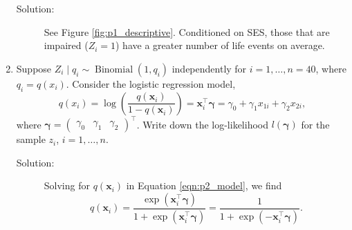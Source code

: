 \documentclass[letterpaper,11pt]{article}
\begin{document}
\begin{enumerate}
  \begin{description}
  \item[Solution:] See Figure \ref{fig:p1_descriptive}. Conditioned on SES,
    those that are impaired ($Z_i = 1$) have a greater number of life events on
    average.
  \end{description}
\item Suppose $Z_i \mid q_i \sim \operatorname{Binomial}\left(1, q_i\right)$
  independently for $i = 1,\ldots, n = 40$, where $q_i =
  q\left(x_i\right)$. Consider the logistic regression model,
  \begin{equation}
    q\left(x_i\right) = \log\left(
      \frac{q\left(\mathbf{x}_i\right)}{1 - q\left(\mathbf{x}_i\right)}
    \right)
    =
    \mathbf{x}_i^\intercal \bm{\gamma}
    = \gamma_0 + \gamma_1 x_{1i} + \gamma_2 x_{2i},
    \label{eqn:p2_model}
  \end{equation}  
  where $\bm{\gamma} = \begin{pmatrix}\gamma_0 & \gamma_1 & \gamma_2
  \end{pmatrix}^\intercal$. Write down the log-likelihood
  $l\left(\bm{\gamma}\right)$ for the sample $z_i$, $i = 1,\ldots, n$.

  \begin{description}
  \item[Solution:] Solving for $q\left(\mathbf{x}_i\right)$ in Equation
    \ref{eqn:p2_model}, we find
    \begin{equation}
      q\left(\mathbf{x}_i\right)
      = \frac{\exp\left(\mathbf{x}_i^\intercal \bm{\gamma}\right)}
      {1 + \exp\left(\mathbf{x}_i^\intercal \bm{\gamma}\right)}
      = \frac{1}
      {1 + \exp\left(-\mathbf{x}_i^\intercal \bm{\gamma}\right)}.
      \label{eqn:p2_qi}
    \end{equation}


\end{description}
\end{enumerate}
\end{document}
